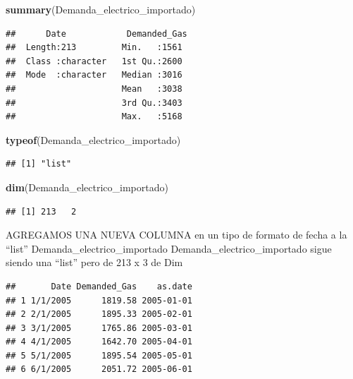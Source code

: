 \documentclass[
]{article}
\newenvironment{Shaded}{\begin{snugshade}}{\end{snugshade}}
\newcommand{\AttributeTok}[1]{\textcolor[rgb]{0.13,0.29,0.53}{#1}}
\newcommand{\FunctionTok}[1]{\textcolor[rgb]{0.13,0.29,0.53}{\textbf{#1}}}
\newcommand{\NormalTok}[1]{#1}
\newcommand{\OtherTok}[1]{\textcolor[rgb]{0.56,0.35,0.01}{#1}}
\newcommand{\SpecialCharTok}[1]{\textcolor[rgb]{0.81,0.36,0.00}{\textbf{#1}}}
\newcommand{\StringTok}[1]{\textcolor[rgb]{0.31,0.60,0.02}{#1}}
\begin{document}
\begin{Shaded}
\begin{Highlighting}[]
\FunctionTok{summary}\NormalTok{(Demanda\_electrico\_importado)}
\end{Highlighting}
\end{Shaded}

\begin{verbatim}
##      Date            Demanded_Gas 
##  Length:213         Min.   :1561  
##  Class :character   1st Qu.:2600  
##  Mode  :character   Median :3016  
##                     Mean   :3038  
##                     3rd Qu.:3403  
##                     Max.   :5168
\end{verbatim}

\begin{Shaded}
\begin{Highlighting}[]
\FunctionTok{typeof}\NormalTok{(Demanda\_electrico\_importado)}
\end{Highlighting}
\end{Shaded}

\begin{verbatim}
## [1] "list"
\end{verbatim}

\begin{Shaded}
\begin{Highlighting}[]
\FunctionTok{dim}\NormalTok{(Demanda\_electrico\_importado)}
\end{Highlighting}
\end{Shaded}

\begin{verbatim}
## [1] 213   2
\end{verbatim}

AGREGAMOS UNA NUEVA COLUMNA en un tipo de formato de fecha a la ``list''
Demanda\_electrico\_importado Demanda\_electrico\_importado sigue siendo
una ``list'' pero de 213 x 3 de Dim

\begin{Shaded}
\end{Shaded}

\begin{verbatim}
##       Date Demanded_Gas    as.date
## 1 1/1/2005      1819.58 2005-01-01
## 2 2/1/2005      1895.33 2005-02-01
## 3 3/1/2005      1765.86 2005-03-01
## 4 4/1/2005      1642.70 2005-04-01
## 5 5/1/2005      1895.54 2005-05-01
## 6 6/1/2005      2051.72 2005-06-01
\end{verbatim}
\end{document}
